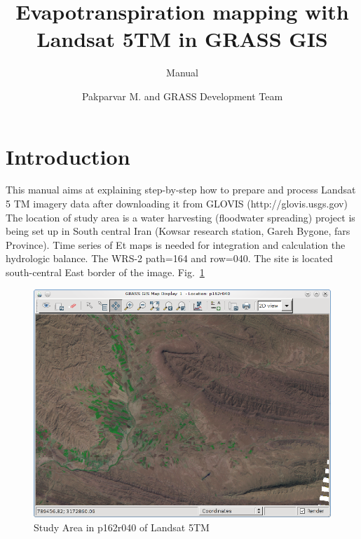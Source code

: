%


\title{Evapotranspiration mapping with Landsat 5TM in GRASS GIS}
\subtitle{Manual}
\author{Pakparvar M. and GRASS Development Team}

\maketitle

\section{Introduction}

This manual aims at explaining step-by-step how to prepare and process Landsat 5 TM imagery data after downloading it from GLOVIS (http://glovis.usgs.gov) The location of study area is a water harvesting (floodwater spreading) project is being set up in South central Iran (Kowsar research station, Gareh Bygone, fars Province). Time series of Et maps is needed for integration and calculation the hydrologic balance. The WRS-2 path=164 and row=040. The site is located south-central East border of the image. Fig.~\ref{fig:gipe000}\newline

\begin{figure}[htbp]
   \centering
   \includegraphics[scale=0.4]{gipe000.png}
   \caption{Study Area in p162r040 of Landsat 5TM}
   \label{fig:gipe000}
\end{figure}

